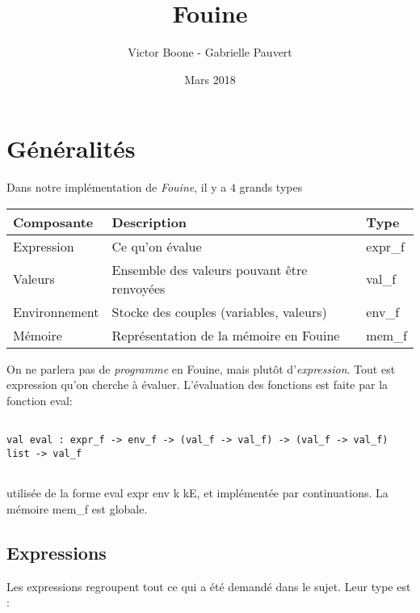 \documentclass{article}
\title{\textbf{Fouine}}
\date{Mars 2018}
\author{Victor Boone - Gabrielle Pauvert}
\newcommand\code[1]{{\fontfamily{lmtt}\selectfont #1}}
\begin{document}
\maketitle
\tableofcontents

\section{Généralités}

	Dans notre implémentation de \emph{Fouine}, il y a $4$ grands types
	
	\vspace{0.5cm}
	
	\begin{tabular}{l l l}
	Composante & Description & Type \\
	\hline
	Expression & Ce qu'on évalue & \code{expr\_f} \\
	Valeurs & Ensemble des valeurs pouvant être renvoyées & \code{val\_f} \\
	Environnement & Stocke des couples (variables, valeurs) & \code{env\_f} \\
	Mémoire & Représentation de la mémoire en Fouine & \code{mem\_f} 
	\end{tabular}
	
	\vspace{0.5cm}
	
	On ne parlera pas de \emph{programme} en Fouine, mais plutôt d'\emph{expression}. Tout est expression qu'on cherche à évaluer. L'évaluation des fonctions est faite par la fonction \code{eval}:
	
	
	\begin{verbatim}
	
val eval : expr_f -> env_f -> (val_f -> val_f) -> (val_f -> val_f) list -> val_f
	
	\end{verbatim}
	
	utilisée de la forme \code{eval expr env k kE}, et implémentée par continuations.
	La mémoire \code{mem\_f} est globale.

\subsection{Expressions}

	Les expressions regroupent tout ce qui a été demandé dans le sujet. Leur type est :
	
\end{document}
